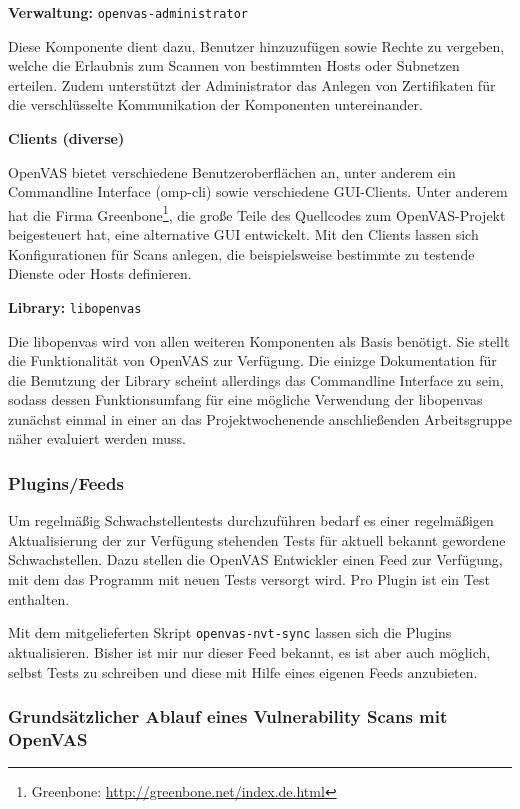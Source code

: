 \textbf{Verwaltung:} \texttt{openvas-administrator}

Diese Komponente dient dazu, Benutzer hinzuzufügen sowie Rechte zu vergeben, welche die 
Erlaubnis zum Scannen von bestimmten Hosts oder Subnetzen erteilen. Zudem unterstützt 
der Administrator das Anlegen von Zertifikaten für die verschlüsselte Kommunikation der 
Komponenten untereinander. \cite[S.19]{openvas-kompendium}

\textbf{Clients (diverse)}

OpenVAS bietet verschiedene Benutzeroberflächen an, unter anderem ein Commandline Interface 
(omp-cli) sowie verschiedene GUI-Clients. Unter anderem hat die Firma 
Greenbone\footnote{Greenbone: \url{http://greenbone.net/index.de.html}}, die große Teile 
des Quellcodes zum OpenVAS-Projekt beigesteuert hat, eine alternative GUI entwickelt.
Mit den Clients lassen sich Konfigurationen für Scans anlegen, die beispielsweise bestimmte 
zu testende Dienste oder Hosts definieren. 
\cite[S.35-49]{openvas-kompendium} 

\textbf{Library:} \texttt{libopenvas}

Die libopenvas wird von allen weiteren Komponenten als Basis benötigt. Sie stellt 
die Funktionalität von OpenVAS zur Verfügung. Die einizge Dokumentation für die 
Benutzung der Library scheint allerdings das Commandline Interface zu sein, sodass 
dessen Funktionsumfang für eine mögliche Verwendung der libopenvas zunächst einmal 
in einer an das Projektwochenende anschließenden Arbeitsgruppe näher evaluiert werden muss. 

\subsubsection{Plugins/Feeds}

Um regelmäßig Schwachstellentests durchzuführen bedarf es einer regelmäßigen 
Aktualisierung der zur Verfügung stehenden Tests für aktuell bekannt 
gewordene Schwachstellen. Dazu stellen die OpenVAS Entwickler einen Feed zur Verfügung, 
mit dem das Programm mit neuen Tests versorgt wird. Pro Plugin ist ein Test enthalten. 
\cite{openvas-feed}

Mit dem mitgelieferten Skript \texttt{openvas-nvt-sync} lassen sich die Plugins 
aktualisieren. Bisher ist mir nur dieser Feed bekannt, es ist aber auch möglich, 
selbst Tests zu schreiben und diese mit Hilfe eines eigenen Feeds anzubieten. 

\subsubsection{Grundsätzlicher Ablauf eines Vulnerability Scans mit OpenVAS}

